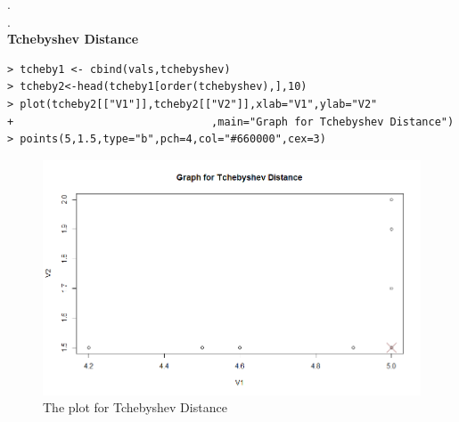 \documentclass[fontsize=10pt]{scrartcl}
\begin{document}
\begin{enumerate}
\begin{enumerate}
			. \\
				. \\
				\textbf{\large Tchebyshev Distance} \\
\begin{verbatim}
> tcheby1 <- cbind(vals,tchebyshev)
> tcheby2<-head(tcheby1[order(tchebyshev),],10)
> plot(tcheby2[["V1"]],tcheby2[["V2"]],xlab="V1",ylab="V2"
+								,main="Graph for Tchebyshev Distance")
> points(5,1.5,type="b",pch=4,col="#660000",cex=3)
\end{verbatim}
			\begin{figure}[H]
				\begin{center}
					\includegraphics[scale=.5]{resources/tchebyshev.png}
					\caption{The plot for Tchebyshev Distance}
				\end{center}
			\end{figure}

			\end{enumerate}
	\end{enumerate}
\end{document}
